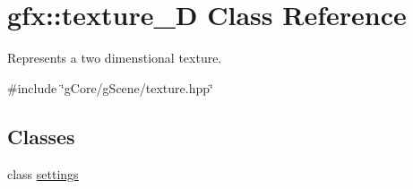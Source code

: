 \hypertarget{classgfx_1_1texture__2D}{\section{gfx\-:\-:texture\-\_\-D Class Reference}
\label{classgfx_1_1texture__2D}
}


Represents a two dimenstional texture.  




{\ttfamily \#include \char`\"{}g\-Core/g\-Scene/texture.\-hpp\char`\"{}}

\subsection*{Classes}
\begin{DoxyCompactItemize}
\item 
class \hyperlink{classgfx_1_1texture__2D_1_1settings}{settings}
\end{DoxyCompactItemize}
